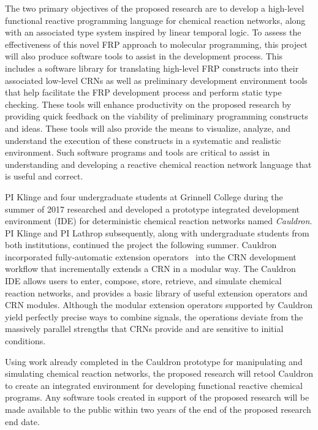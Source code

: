 The two primary objectives of the proposed research are to develop a high-level functional reactive programming language for chemical reaction networks, along with an associated type system inspired by linear temporal logic.
To assess the effectiveness of this novel FRP approach to molecular programming, this project will also produce software tools to assist in the development process.
This includes a software library for translating high-level FRP constructs into their associated low-level CRNs as well as preliminary development environment tools that help facilitate the FRP development process and perform static type checking.
These tools will enhance productivity on the proposed research by providing quick feedback on the viability of preliminary programming constructs and ideas.  These tools will also provide the means to visualize, analyze, and understand the execution of these constructs in a systematic and realistic environment.
Such software programs and tools are critical to assist in understanding and developing a reactive chemical reaction network language that is useful and correct. 

PI Klinge and four undergraduate students at Grinnell College during the summer of 2017 researched and developed a prototype integrated development environment (IDE) for deterministic chemical reaction networks named \emph{Cauldron}.
PI Klinge and PI Lathrop subsequently, along with undergraduate students from both institutions, continued the project the following summer.
Cauldron incorporated fully-automatic extension operators~\cite{oKlin16} into the CRN development workflow that incrementally extends a CRN in a modular way.
The Cauldron IDE allows users to enter, compose, store, retrieve, and simulate chemical reaction networks, and provides a basic library of useful extension operators and CRN modules.
Although the modular extension operators supported by Cauldron yield perfectly precise ways to combine signals, the operations deviate from the massively parallel strengths that CRNs provide and are sensitive to initial conditions.

Using work already completed in the Cauldron prototype for manipulating and simulating chemical reaction networks, the proposed research will retool Cauldron to create an integrated environment for developing functional reactive chemical programs.
Any software tools created in support of the proposed research will be made available to the public within two years of the end of the proposed research end date. 



